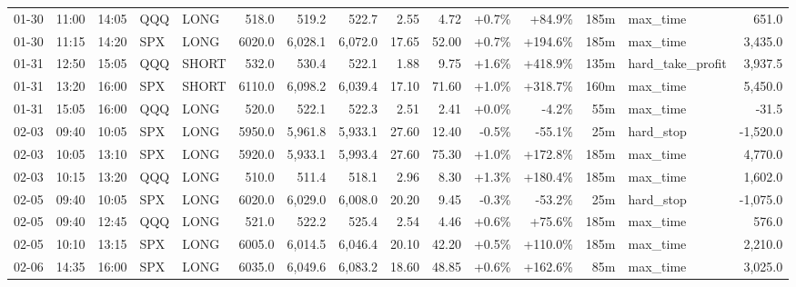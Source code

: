 \documentclass[11pt,a4paper,twoside]{article}
\begin{document}
\begin{landscape}
\begin{center}
\begin{longtable}{>{\color{txtmain}}l l l l l r r r r r r r r >{\color{txtmain}}l r}
01-30 & 11:00 & 14:05 & QQQ & LONG & 518.0 & 519.2 & 522.7 & 2.55 & 4.72 & \textcolor{wingreen}{+0.7\%} & \textcolor{wingreen}{+84.9\%} & 185m & max\_time & \textcolor{wingreen}{651.0} \\
01-30 & 11:15 & 14:20 & SPX & LONG & 6020.0 & 6,028.1 & 6,072.0 & 17.65 & 52.00 & \textcolor{wingreen}{+0.7\%} & \textcolor{wingreen}{+194.6\%} & 185m & max\_time & \textcolor{wingreen}{3,435.0} \\
01-31 & 12:50 & 15:05 & QQQ & SHORT & 532.0 & 530.4 & 522.1 & 1.88 & 9.75 & \textcolor{wingreen}{+1.6\%} & \textcolor{wingreen}{+418.9\%} & 135m & hard\_take\_profit & \textcolor{wingreen}{3,937.5} \\
01-31 & 13:20 & 16:00 & SPX & SHORT & 6110.0 & 6,098.2 & 6,039.4 & 17.10 & 71.60 & \textcolor{wingreen}{+1.0\%} & \textcolor{wingreen}{+318.7\%} & 160m & max\_time & \textcolor{wingreen}{5,450.0} \\
01-31 & 15:05 & 16:00 & QQQ & LONG & 520.0 & 522.1 & 522.3 & 2.51 & 2.41 & \textcolor{wingreen}{+0.0\%} & \textcolor{lossred}{-4.2\%} & 55m & max\_time & \textcolor{lossred}{-31.5} \\
02-03 & 09:40 & 10:05 & SPX & LONG & 5950.0 & 5,961.8 & 5,933.1 & 27.60 & 12.40 & \textcolor{lossred}{-0.5\%} & \textcolor{lossred}{-55.1\%} & 25m & hard\_stop & \textcolor{lossred}{-1,520.0} \\
02-03 & 10:05 & 13:10 & SPX & LONG & 5920.0 & 5,933.1 & 5,993.4 & 27.60 & 75.30 & \textcolor{wingreen}{+1.0\%} & \textcolor{wingreen}{+172.8\%} & 185m & max\_time & \textcolor{wingreen}{4,770.0} \\
02-03 & 10:15 & 13:20 & QQQ & LONG & 510.0 & 511.4 & 518.1 & 2.96 & 8.30 & \textcolor{wingreen}{+1.3\%} & \textcolor{wingreen}{+180.4\%} & 185m & max\_time & \textcolor{wingreen}{1,602.0} \\
02-05 & 09:40 & 10:05 & SPX & LONG & 6020.0 & 6,029.0 & 6,008.0 & 20.20 & 9.45 & \textcolor{lossred}{-0.3\%} & \textcolor{lossred}{-53.2\%} & 25m & hard\_stop & \textcolor{lossred}{-1,075.0} \\
02-05 & 09:40 & 12:45 & QQQ & LONG & 521.0 & 522.2 & 525.4 & 2.54 & 4.46 & \textcolor{wingreen}{+0.6\%} & \textcolor{wingreen}{+75.6\%} & 185m & max\_time & \textcolor{wingreen}{576.0} \\
02-05 & 10:10 & 13:15 & SPX & LONG & 6005.0 & 6,014.5 & 6,046.4 & 20.10 & 42.20 & \textcolor{wingreen}{+0.5\%} & \textcolor{wingreen}{+110.0\%} & 185m & max\_time & \textcolor{wingreen}{2,210.0} \\
02-06 & 14:35 & 16:00 & SPX & LONG & 6035.0 & 6,049.6 & 6,083.2 & 18.60 & 48.85 & \textcolor{wingreen}{+0.6\%} & \textcolor{wingreen}{+162.6\%} & 85m & max\_time & \textcolor{wingreen}{3,025.0} \\

\end{longtable}
\end{center}
\end{landscape}
\end{document}
